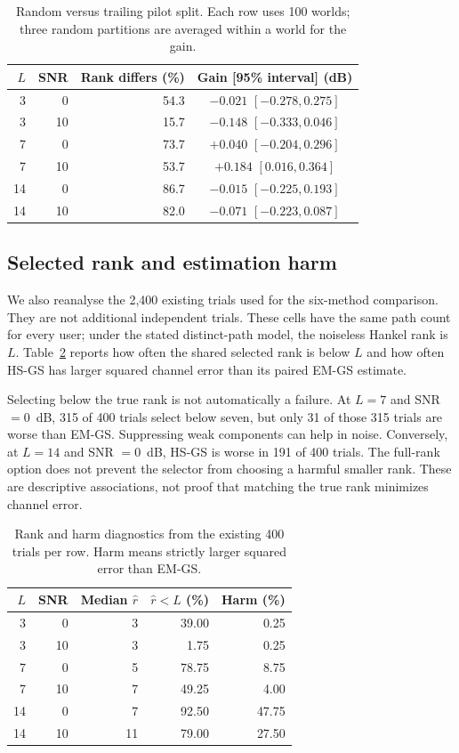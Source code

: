 \documentclass[journal]{IEEEtran}
\begin{document}
\begin{table}[!t]
\caption{Random versus trailing pilot split. Each row uses 100 worlds;
three random partitions are averaged within a world for the gain.}
\label{tab:split-stability}
\centering\footnotesize
\begin{tabular}{rrrc}
\toprule
$L$ & SNR & Rank differs (\%) & Gain [95\% interval] (dB)\\
\midrule
3 & 0 & 54.3 & $-0.021$ $[-0.278,0.275]$\\
3 & 10 & 15.7 & $-0.148$ $[-0.333,0.046]$\\
7 & 0 & 73.7 & $+0.040$ $[-0.204,0.296]$\\
7 & 10 & 53.7 & $+0.184$ $[0.016,0.364]$\\
14 & 0 & 86.7 & $-0.015$ $[-0.225,0.193]$\\
14 & 10 & 82.0 & $-0.071$ $[-0.223,0.087]$\\
\bottomrule
\end{tabular}
\end{table}

\subsection{Selected rank and estimation harm}

We also reanalyse the 2,400 existing trials used for the six-method
comparison. They are not additional independent trials. These cells have
the same path count for every user; under the stated distinct-path model,
the noiseless Hankel rank is $L$. Table~\ref{tab:rank-harm} reports how
often the shared selected rank is below $L$ and how often HS-GS has
larger squared channel error than its paired EM-GS estimate.

Selecting below the true rank is not automatically a failure. At $L=7$
and SNR $=0$~dB, 315 of 400 trials select below seven, but only 31 of
those 315 trials are worse than EM-GS. Suppressing weak components can
help in noise. Conversely, at $L=14$ and SNR $=0$~dB, HS-GS is worse
in 191 of 400 trials. The full-rank option does not prevent the selector
from choosing a harmful smaller rank. These are descriptive associations,
not proof that matching the true rank minimizes channel error.

\begin{table}[!t]
\caption{Rank and harm diagnostics from the existing 400 trials per row.
Harm means strictly larger squared error than EM-GS.}
\label{tab:rank-harm}
\centering\footnotesize
\begin{tabular}{rrrrr}
\toprule
$L$ & SNR & Median $\widehat r$ & $\widehat r<L$ (\%) & Harm (\%)\\
\midrule
3 & 0 & 3 & 39.00 & 0.25\\
3 & 10 & 3 & 1.75 & 0.25\\
7 & 0 & 5 & 78.75 & 8.75\\
7 & 10 & 7 & 49.25 & 4.00\\
14 & 0 & 7 & 92.50 & 47.75\\
14 & 10 & 11 & 79.00 & 27.50\\
\bottomrule
\end{tabular}
\end{table}
\end{document}
